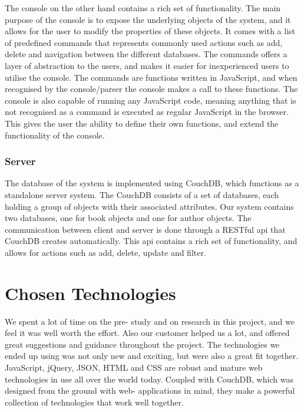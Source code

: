 The console on the other hand contains a rich set of functionality. The main purpose of the console is to expose the underlying objects of the system, and it allows for the user to modify the properties of these objects. It comes with a list of predefined commands that represents commonly used actions such as add, delete and navigation between the different databases. The commands offers a layer of abstraction to the users, and makes it easier for inexperienced users to utilise the console. The commands are functions written in JavaScript, and when recognised by the console/parser the console makes a call to these functions. The console is also capable of running any JavaScript code, meaning anything that is not recognised as a command is executed as regular JavaScript in the browser. This gives the user the ability to define their own functions, and extend the functionality of the console.

\subsubsection{Server}
The database of the system is implemented using CouchDB, which functions as a standalone server system. The CouchDB consists of a set of databases, each holding a group of objects with their associated attributes. Our system contains two databases, one for book objects and one for author objects. The communication between client and server is done through a RESTful api that CouchDB creates automatically. This api contains a rich set of functionality, and allows for actions such as add, delete, update and filter. 

\section{Chosen Technologies}
We spent a lot of time on the pre- study and on research in this project, and we feel it was well worth the effort. Also our customer helped us a lot, and offered great suggestions and guidance throughout the project. The technologies we ended up using was not only new and exciting, but were also a great fit together. JavaScript, jQuery, JSON, HTML and CSS are robust and mature web technologies in use all over the world today. Coupled with CouchDB, which was designed from the ground with web- applications in mind, they make a powerful collection of technologies that work well together.

